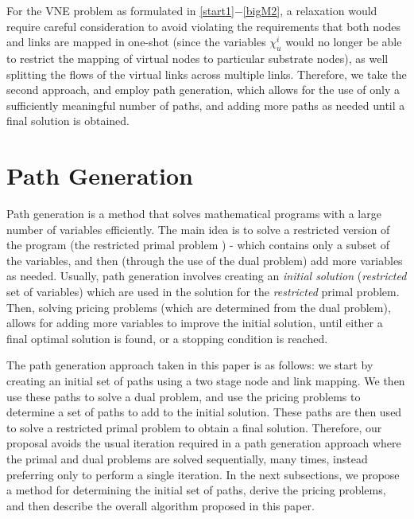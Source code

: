\documentclass[journal]{IEEEtran}
\begin{document}
For the VNE problem as formulated in \eqref{start1}$-$\eqref{bigM2}, a relaxation would require careful consideration to avoid violating the requirements that both nodes and links are mapped in one-shot (since the variables $\chi_{u}^{i}$ would no longer be able to restrict the mapping of virtual nodes to particular substrate nodes), as well splitting the flows of the virtual links across multiple links. Therefore, we take the second approach, and employ path generation, which allows for the use of only a sufficiently meaningful number of paths, and adding more paths as needed until a final solution is obtained.

\section{Path Generation}
Path generation is a method that solves mathematical programs with a large number of variables efficiently. The main idea is to solve a restricted version of the program (the restricted primal problem \cite{Goemans97}) - which contains only a subset of the variables, and then (through the use of the dual problem\cite{Goemans97}) add more variables as needed. Usually, path generation involves creating an \textit{initial solution} (\textit{restricted} set of variables) which are used in the solution for the \textit{restricted} primal problem. Then, solving pricing problems (which are determined from the dual problem), allows for adding more variables to improve the initial solution, until either a final optimal solution is found, or a stopping condition is reached.

The path generation approach taken in this paper is as follows: we start by creating an initial set of paths using a two stage node and link mapping. We then use these paths to solve a dual problem, and use the pricing problems to determine a set of paths to add to the initial solution. These paths are then used to solve a restricted primal problem to obtain a final solution. Therefore, our proposal avoids the usual iteration required in a path generation approach where the primal and dual problems are solved sequentially, many times, instead preferring only to perform a single iteration. In the next subsections, we propose a method for determining the initial set of paths, derive the pricing problems, and then describe the overall algorithm proposed in this paper.
\end{document}
